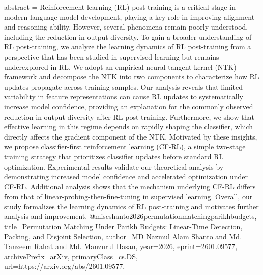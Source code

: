 {      abstract = {Reinforcement learning (RL) post-training is a critical stage in modern language model development, playing a key role in improving alignment and reasoning ability. However, several phenomena remain poorly understood, including the reduction in output diversity. To gain a broader understanding of RL post-training, we analyze the learning dynamics of RL post-training from a perspective that has been studied in supervised learning but remains underexplored in RL. We adopt an empirical neural tangent kernel (NTK) framework and decompose the NTK into two components to characterize how RL updates propagate across training samples. Our analysis reveals that limited variability in feature representations can cause RL updates to systematically increase model confidence, providing an explanation for the commonly observed reduction in output diversity after RL post-training. Furthermore, we show that effective learning in this regime depends on rapidly shaping the classifier, which directly affects the gradient component of the NTK. Motivated by these insights, we propose classifier-first reinforcement learning (CF-RL), a simple two-stage training strategy that prioritizes classifier updates before standard RL optimization. Experimental results validate our theoretical analysis by demonstrating increased model confidence and accelerated optimization under CF-RL. Additional analysis shows that the mechanism underlying CF-RL differs from that of linear-probing-then-fine-tuning in supervised learning. Overall, our study formalizes the learning dynamics of RL post-training and motivates further analysis and improvement.}
}@misc{shanto2026permutationmatchingparikhbudgets,
      title={Permutation Matching Under Parikh Budgets: Linear-Time Detection, Packing, and Disjoint Selection}, 
      author={MD Nazmul Alam Shanto and Md. Tanzeem Rahat and Md. Manzurul Hasan},
      year={2026},
      eprint={2601.09577},
      archivePrefix={arXiv},
      primaryClass={cs.DS},
      url={https://arxiv.org/abs/2601.09577},
}
